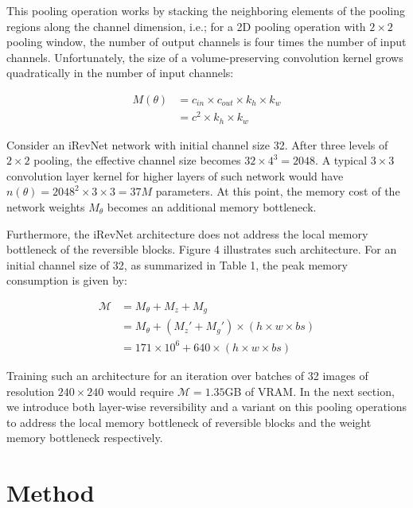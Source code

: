 \documentclass[twocolumn]{bmcart}
\begin{document}
This pooling operation works by stacking the neighboring elements of the pooling regions along the channel dimension,
i.e.; for a 2D pooling operation with $2 \times 2$ pooling window, the number of output channels is four times the number of input channels. 
Unfortunately, the size of a volume-preserving convolution kernel grows quadratically in the number of input channels:

\begin{subequations}
\begin{align}
M(\theta) &= c_{in} \times c_{out} \times k_h \times k_w \\
          &= c^2 \times k_h \times k_w
\end{align}
\end{subequations}

Consider an iRevNet network with initial channel size 32.
After three levels of $2 \times 2$ pooling, the effective channel size becomes $32 \times 4^3=2048$. A typical $3 \times 3$ convolution layer kernel for higher layers of such network would have $n(\theta)=2048^2 \times 3 \times 3=37M$ parameters.
At this point, the memory cost of the network weights $M_{\theta}$ becomes an additional memory bottleneck.

Furthermore, the iRevNet architecture does not address the local memory bottleneck of the reversible blocks.
Figure 4 illustrates such architecture. 
For an initial channel size of 32, as summarized in Table 1, the peak memory consumption is given by:

\begin{subequations}
\begin{align}
\mathcal{M} &= M_{\theta} + M_{z} + M_{g} \\
            &= M_{\theta} + (M_z' + M_{g}') \times (h \times w \times bs) \\
            &= 171 \times 10^6 + 640 \times (h \times w \times bs) 
\end{align}
\end{subequations}

Training such an architecture for an iteration over batches of 32 images of resolution $240 \times 240$ would require $\mathcal{M}=1.35$GB of VRAM.
In the next section, we introduce both layer-wise reversibility and a variant on this pooling operations to address the local memory bottleneck 
of reversible blocks and the weight memory bottleneck respectively.

\section{Method}
\end{document}

